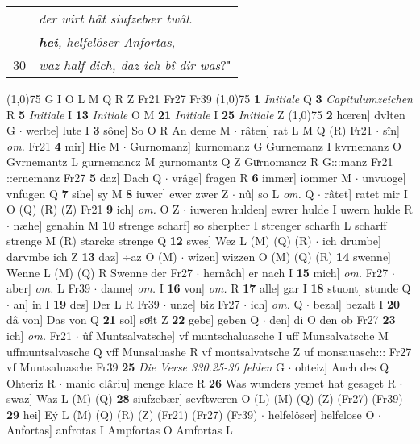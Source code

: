 \documentclass[8pt,a4paper,notitlepage]{article}
\begin{document}
\begin{table}[ht]
\begin{minipage}[t]{0.5\linewidth}
\begin{tabular}{rl}
 & \textit{der wirt hât siufzebær twâl}.\\ 
 & \textit{\textbf{hei}, helfelôser Anfortas},\\ 
30 & \textit{waz half dich, daz ich bî dir was}?"\\ 
\end{tabular}
\scriptsize
\line(1,0){75} \newline
G I O L M Q R Z Fr21 Fr27 Fr39 \newline
\line(1,0){75} \newline
\textbf{1} \textit{Initiale} Q  \textbf{3} \textit{Capitulumzeichen} R  \textbf{5} \textit{Initiale} I  \textbf{13} \textit{Initiale} O M  \textbf{21} \textit{Initiale} I  \textbf{25} \textit{Initiale} Z  \newline
\line(1,0){75} \newline
\textbf{2} hœren] dvlten G  $\cdot$ werlte] lute I \textbf{3} sône] So O R An deme M  $\cdot$ râten] rat L M Q (R) Fr21  $\cdot$ sîn] \textit{om.} Fr21 \textbf{4} mir] Hie M  $\cdot$ Gurnomanz] kurnomanz G Gurnemanz I kvrnemanz O Gvrnemantz L gurnemancz M gurnomantz Q Z Guͯrnomancz R G:::manz Fr21 ::ernemanz Fr27 \textbf{5} daz] Dach Q  $\cdot$ vrâge] fragen R \textbf{6} immer] iommer M  $\cdot$ unvuoge] vnfugen Q \textbf{7} sihe] sy M \textbf{8} iuwer] ewer zwer Z  $\cdot$ nû] so L \textit{om.} Q  $\cdot$ râtet] ratet mir I O (Q) (R) (Z) Fr21 \textbf{9} ich] \textit{om.} O Z  $\cdot$ iuweren hulden] ewrer hulde I uwern hulde R  $\cdot$ næhe] genahin M \textbf{10} strenge scharf] so sherpher I strenger scharfh L scharff strenge M (R) starcke strenge Q \textbf{12} swes] Wez L (M) (Q) (R)  $\cdot$ ich drumbe] darvmbe ich Z \textbf{13} daz] ÷az O (M)  $\cdot$ wîzen] wizzen O (M) (Q) (R) \textbf{14} swenne] Wenne L (M) (Q) R Swenne der Fr27  $\cdot$ hernâch] er nach I \textbf{15} mich] \textit{om.} Fr27  $\cdot$ aber] \textit{om.} L Fr39  $\cdot$ danne] \textit{om.} I \textbf{16} von] \textit{om.} R \textbf{17} alle] gar I \textbf{18} stuont] stunde Q  $\cdot$ an] in I \textbf{19} des] Der L R Fr39  $\cdot$ unze] biz Fr27  $\cdot$ ich] \textit{om.} Q  $\cdot$ bezal] bezalt I \textbf{20} dâ von] Das von Q \textbf{21} sol] soͤlt Z \textbf{22} gebe] geben Q  $\cdot$ den] di O den ob Fr27 \textbf{23} ich] \textit{om.} Fr21  $\cdot$ ûf Muntsalvatsche] vf muntschaluasche I uff Munsalvatsche M uffmuntsalvasche Q vff Munsaluashe R vf montsalvatsche Z uf monsauasch::: Fr27 vf Muntsaluasche Fr39 \textbf{25} \textit{Die Verse 330.25-30 fehlen} G   $\cdot$ ohteiz] Auch des Q Ohteriz R  $\cdot$ manic clâriu] menge klare R \textbf{26} Was wunders yemet hat gesaget R  $\cdot$ swaz] Waz L (M) (Q) \textbf{28} siufzebær] sevftweren O (L) (M) (Q) (Z) (Fr27) (Fr39) \textbf{29} hei] Eý L (M) (Q) (R) (Z) (Fr21) (Fr27) (Fr39)  $\cdot$ helfelôser] helfelose O  $\cdot$ Anfortas] anfrotas I Ampfortas O Amfortas L \newline

\end{minipage}
\end{table}
\end{document}
